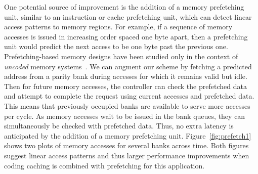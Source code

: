 One potential source of improvement is the addition of a memory prefetching unit, similar to an instruction or cache prefetching unit, which can detect linear access patterns to memory regions. For example, if a sequence of memory accesses is issued in increasing order spaced one byte apart, then a prefetching unit would predict the next access to be one byte past the previous one. 
Prefetching-based memory designs have been studied only in the context of {\em uncoded} memory systems~\cite{Kim2016, Kadjo2014, Shevgoor2015, JL2013}. We can augment our scheme by fetching a predicted address from a parity bank during accesses for which it remains valid but idle. Then for future memory accesses, the controller can check the prefetched data and attempt to complete the request using current accesses and prefetched data. This means that previously occupied banks are available to serve more accesses per cycle. As memory accesses wait to be issued in the bank queues, they can simultaneously be checked with prefetched data. Thus, no extra latency is anticipated by the addition of a memory prefetching unit.
%
Figure~\ref{fig:prefetch1} shows two plots of memory accesses for several banks across time. Both figures suggest linear access patterns and thus larger performance improvements when coding caching is combined with prefetching for this application.

